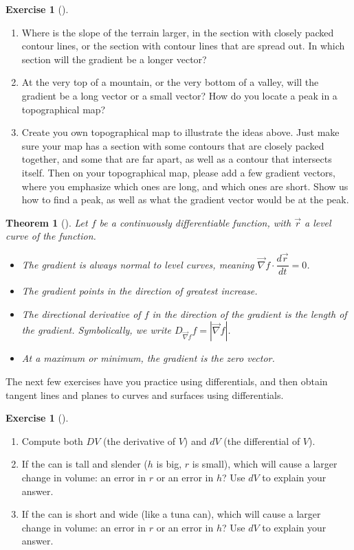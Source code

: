 \documentclass[10pt,]{book}
\theoremstyle{plain}
\newtheorem{theorem}{Theorem}[section]
\theoremstyle{definition}
\theoremstyle{definition}
\theoremstyle{definition}
\theoremstyle{definition}
\newtheorem{exploration}[project]{Exercise}
\theoremstyle{definition}
\numberwithin{equation}{section}
\begin{document}
\begin{exploration}[]\label{exploration-230}
\leavevmode%
\begin{enumerate}[font=\bfseries,label=(\alph*),ref=\alph*]
\item\label{task-613} Where is the slope of the terrain larger, in the section with closely packed contour lines, or the section with contour lines that are spread out. In which section will the gradient be a longer vector?%
\item\label{task-614} At the very top of a mountain, or the very bottom of a valley, will the gradient be a long vector or a small vector? How do you locate a peak in a topographical map?%
\item\label{task-615} Create you own topographical map to illustrate the ideas above. Just make sure your map has a section with some contours that are closely packed together, and some that are far apart, as well as a contour that intersects itself. Then on your topographical map, please add a few gradient vectors, where you emphasize which ones are long, and which ones are short. Show us how to find a peak, as well as what the gradient vector would be at the peak.%
\end{enumerate}
\end{exploration}
\begin{theorem}[{}]\label{theorem-7}
Let \(f\) be a continuously differentiable function, with \(\vec r\) a level curve of the function. \leavevmode%
\begin{itemize}[label=\textbullet]
\item{}The gradient is always normal to level curves, meaning \(\vec \nabla f\cdot \dfrac{d\vec r}{dt}=0\).%
\item{}The gradient points in the direction of greatest increase.%
\item{}The directional derivative of \(f\) in the direction of the gradient is the length of the gradient. Symbolically, we write \(D_{\vec \nabla f}f = |\vec \nabla f|\).%
\item{}At a maximum or minimum, the gradient is the zero vector.%
\end{itemize}
%
\end{theorem}
The next few exercises have you practice using differentials, and then obtain tangent lines and planes to curves and surfaces using differentials.%
\begin{exploration}[]\label{exploration-231}
\leavevmode%
\begin{enumerate}[font=\bfseries,label=(\alph*),ref=\alph*]
\item\label{task-616} Compute both \(DV\) (the derivative of \(V\)) and \(dV\) (the differential of \(V\)).%
\item\label{task-617} If the can is tall and slender (\(h\) is big, \(r\) is small), which will cause a larger change in volume: an error in \(r\) or an error in \(h\)? Use \(dV\) to explain your answer.%
\item\label{task-618} If the can is short and wide (like a tuna can), which will cause a larger change in volume: an error in \(r\) or an error in \(h\)? Use \(dV\) to explain your answer.%
\end{enumerate}
\end{exploration}
\end{document}
